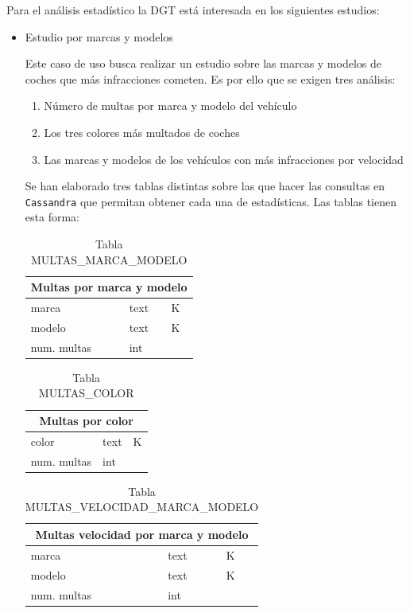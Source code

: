 \documentclass[]{article}
\begin{document}
Para el análisis estadístico la DGT está interesada en los siguientes estudios:
\begin{itemize}
    \item Estudio por marcas y modelos

    Este caso de uso busca realizar un estudio sobre las marcas y modelos de coches que más infracciones cometen. Es por ello que se exigen tres análisis:
    
    \begin{enumerate}
        \item Número de multas por marca y modelo del vehículo
        \item Los tres colores más multados de coches
        \item Las marcas y modelos de los vehículos con más infracciones por velocidad
    \end{enumerate}

    Se han elaborado tres tablas distintas sobre las que hacer las consultas en \texttt{Cassandra} que permitan obtener cada una de estadísticas. Las tablas tienen esta forma:
\begin{table}[H]
    \centering
    \begin{tabular}{lll} 
        \toprule
        \multicolumn{3}{c}{\large\textbf{Multas por marca y modelo}} \\ 
        \midrule
        marca       & text & K\\
        modelo      & text & K\\
        num. multas & int &\\
        \bottomrule
    \end{tabular}
    \caption {Tabla MULTAS\_MARCA\_MODELO}
\end{table}

\begin{table}[H]
    \centering
    \begin{tabular}{lll} 
        \toprule
        \multicolumn{3}{c}{\large\textbf{Multas por color}} \\ 
        \midrule
        color       & text & K\\
        num. multas & int & \\
        \bottomrule
    \end{tabular}
    \caption {Tabla MULTAS\_COLOR}
\end{table}

\begin{table}[H]
    \centering
    \begin{tabular}{lll} 
        \toprule
        \multicolumn{3}{c}{\large\textbf{Multas velocidad por marca y modelo}} \\ 
        \midrule
        marca      & text & K\\
        modelo     & text & K\\
        num. multas & int & \\
        \bottomrule
    \end{tabular} 
    \caption {Tabla MULTAS\_VELOCIDAD\_MARCA\_MODELO}
 \end{table}


\end{itemize}
\end{document}
